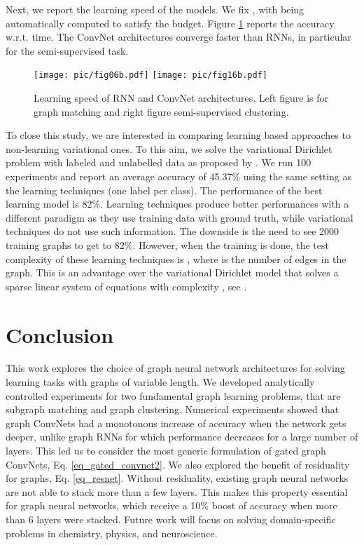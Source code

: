 \documentclass{article} \usepackage{iclr2018_conference,times}
\begin{document}
Next, we report the learning speed of the models. We fix ,  with  being automatically computed to satisfy the budget. Figure \ref{fig_learning_speed} reports the accuracy w.r.t. time. The ConvNet architectures converge faster than RNNs, in particular for the semi-supervised task. 
\begin{figure}[h!]
\centering
\texttt{[image: pic/fig06b.pdf]}
\hspace{-0cm}
\texttt{[image: pic/fig16b.pdf]}
\caption{Learning speed of RNN and ConvNet architectures. Left figure is for graph matching and right figure semi-supervised clustering.}
\label{fig_learning_speed}
\end{figure}



To close this study, we are interested in comparing learning based approaches to non-learning variational ones. To this aim, we solve the variational Dirichlet problem with labeled and unlabelled data as proposed by \cite{art:Grady06RandomWalk}. We run 100 experiments and report an average accuracy of 45.37\% using the  same setting as the learning techniques (one label per class). The performance of the best learning model is 82\%. Learning techniques produce better performances with a different paradigm as they use training data with ground truth, while variational techniques do not use such information. The downside is the need to see 2000 training graphs to get to 82\%. However, when the training is done, the test complexity of these learning techniques is , where  is the number of edges in the graph. This is an advantage over the variational Dirichlet model that solves a sparse linear system of equations with complexity , see \cite{art:LiptonRoseTarjan79spalinsys}. 





\section{Conclusion}

This work explores the choice of graph neural network architectures for solving learning tasks with graphs of variable length. We developed analytically controlled experiments for two fundamental graph learning problems, that are subgraph matching and graph clustering. Numerical experiments showed that graph ConvNets had a monotonous increase of accuracy when the network gets deeper, unlike graph RNNs for which performance decreases for a large number of layers. This led us to consider the most generic formulation of gated graph ConvNets, Eq. \eqref{eq_gated_convnet2}. We also explored the benefit of residuality for graphs, Eq. \eqref{eq_resnet}. Without residuality, existing graph neural networks are not able to stack more than a few layers. This makes this property essential for graph neural networks, which receive a 10\% boost of accuracy when more than 6 layers were stacked. Future work will focus on solving domain-specific problems in chemistry, physics, and neuroscience. 






\end{document}
